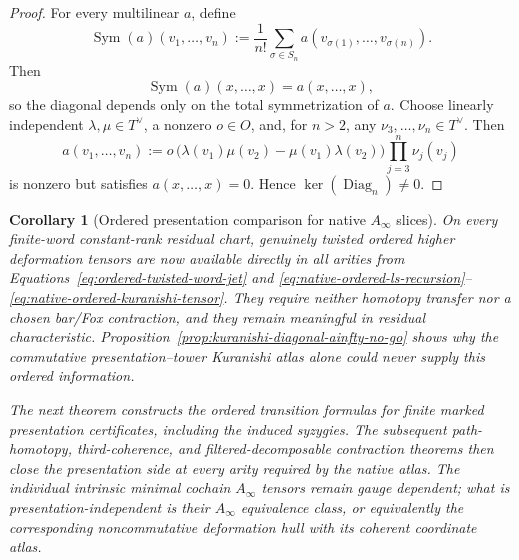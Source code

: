 \documentclass[11pt]{article}
\newtheorem{corollary}[theorem]{Corollary}
\theoremstyle{definition}
\begin{document}
\begin{proof}
For every multilinear $a$, define
\[
 \operatorname{Sym}(a)(v_1,\ldots,v_n)
 :=\frac1{n!}\sum_{\sigma\in S_n}
 a(v_{\sigma(1)},\ldots,v_{\sigma(n)}).
\]
Then
\[
 \operatorname{Sym}(a)(x,\ldots,x)=a(x,\ldots,x),
\]
so the diagonal depends only on the total symmetrization of $a$.  Choose
linearly independent $\lambda,\mu\in T^\vee$, a nonzero $o\in O$, and, for
$n>2$, any $\nu_3,\ldots,\nu_n\in T^\vee$.  Then
\[
 a(v_1,\ldots,v_n)
 :=o\,
 \bigl(\lambda(v_1)\mu(v_2)-\mu(v_1)\lambda(v_2)\bigr)
 \prod_{j=3}^n\nu_j(v_j)
\]
is nonzero but satisfies $a(x,\ldots,x)=0$.  Hence
$\ker(\operatorname{Diag}_n)\ne0$.
\end{proof}

\begin{corollary}[Ordered presentation comparison for native $A_\infty$ slices]\label{cor:native-ordered-ainfinity-boundary}
On every finite-word constant-rank residual chart, genuinely twisted ordered
higher deformation tensors are now available directly in all arities from
Equations~\eqref{eq:ordered-twisted-word-jet} and
\eqref{eq:native-ordered-ls-recursion}--
\eqref{eq:native-ordered-kuranishi-tensor}.  They require neither homotopy
transfer nor a chosen bar/Fox contraction, and they remain meaningful in
residual characteristic.  Proposition~\ref{prop:kuranishi-diagonal-ainfty-no-go}
shows why the commutative presentation--tower Kuranishi atlas alone could
never supply this ordered information.

The next theorem constructs the ordered transition formulas for finite marked presentation certificates, including the induced syzygies.  The subsequent path-homotopy, third-coherence, and filtered-decomposable contraction theorems then close the presentation side at every arity required by the native atlas.  The individual intrinsic minimal cochain $A_\infty$ tensors remain gauge dependent; what is presentation-independent is their $A_\infty$ equivalence class, or equivalently the corresponding noncommutative deformation hull with its coherent coordinate atlas.
\end{corollary}
\end{document}
